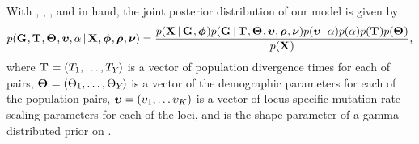 \documentclass[letterpaper,12pt]{article}
\begin{document}
\begin{linenumbers}
\begin{linenomath}
With \alignmentVector, \hkyModelVector, \ploidyScalarVector, and
\mutationRateScalarConstantVector in hand, the joint posterior distribution
of our model is given by
\begin{equation}
    p(\geneTreeVector, \divTimeMapVector, \demographicParamVector, 
    \locusMutationRateScalarVector, \locusRateHetShapeParameter \given
    \alignmentVector, \hkyModelVector, \ploidyScalarVector,
    \mutationRateScalarConstantVector) =
    \frac{p(\alignmentVector \given \geneTreeVector, \hkyModelVector)
        p(\geneTreeVector \given \divTimeMapVector, \demographicParamVector,
        \locusMutationRateScalarVector, \ploidyScalarVector,
        \mutationRateScalarConstantVector)
        p(\locusMutationRateScalarVector \given \locusRateHetShapeParameter)
        p(\locusRateHetShapeParameter)
        p(\divTimeMapVector)
        p(\demographicParamVector)}{
        p(\alignmentVector)},
    \label{eq:fullModelCompact}
\end{equation}
where
$\mathbf{T_{}} = (T_{1}, \ldots, T_{Y_{}})$
is a vector of population divergence times for each of \npairs{} pairs,
$\mathbf{\Theta_{}} = (\Theta_{1}, \ldots,
\Theta_{Y_{}})$
is a vector of the demographic parameters for each of the \npairs{} population
pairs,
$\boldsymbol{\upsilon} = (\upsilon_{1}, \ldots
\upsilon_{K})$
is a vector of locus-specific mutation-rate scaling parameters for each of the
\nlociTotal loci,
and \locusRateHetShapeParameter is the shape parameter of a gamma-distributed
prior on \locusMutationRateScalar{}.
\end{linenomath}


\end{linenumbers}
\end{document}
